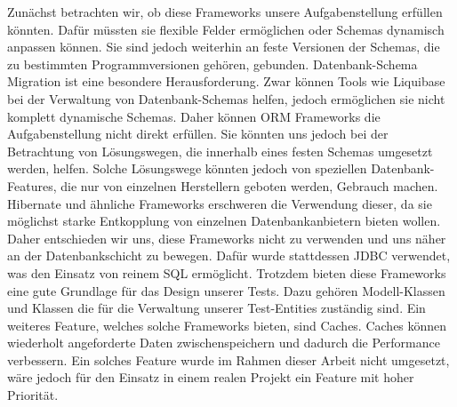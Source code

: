 Zunächst betrachten wir, ob diese Frameworks unsere Aufgabenstellung erfüllen könnten. Dafür müssten sie flexible Felder ermöglichen oder Schemas dynamisch anpassen können. Sie sind jedoch weiterhin an feste Versionen der Schemas, die zu bestimmten Programmversionen gehören, gebunden. Datenbank-Schema Migration ist eine besondere Herausforderung. Zwar können Tools wie Liquibase \cite{Erika.15.06.2021} bei der Verwaltung von Datenbank-Schemas helfen, jedoch ermöglichen sie nicht komplett dynamische Schemas. Daher können ORM Frameworks die Aufgabenstellung nicht direkt erfüllen. Sie könnten uns jedoch bei der Betrachtung von Lösungswegen, die innerhalb eines festen Schemas umgesetzt werden, helfen. Solche Lösungswege könnten jedoch von speziellen Datenbank-Features, die nur von einzelnen Herstellern geboten werden, Gebrauch machen. Hibernate und ähnliche Frameworks erschweren die Verwendung dieser, da sie möglichst starke Entkopplung von einzelnen Datenbankanbietern bieten wollen. Daher entschieden wir uns, diese Frameworks nicht zu verwenden und uns näher an der Datenbankschicht zu bewegen. Dafür wurde stattdessen \ac{JDBC} verwendet, was den Einsatz von reinem \ac{SQL} ermöglicht. Trotzdem bieten diese Frameworks eine gute Grundlage für das Design unserer Tests. Dazu gehören Modell-Klassen und Klassen die für die Verwaltung unserer Test-Entities zuständig sind.
Ein weiteres Feature, welches solche Frameworks bieten, sind Caches. Caches können wiederholt angeforderte Daten zwischenspeichern und dadurch die Performance verbessern. Ein solches Feature wurde im Rahmen dieser Arbeit nicht umgesetzt, wäre jedoch für den Einsatz in einem realen Projekt ein Feature mit hoher Priorität.





